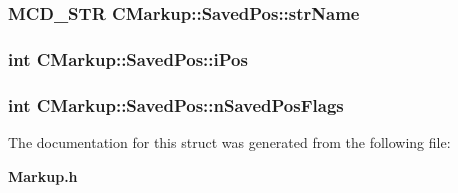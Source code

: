 \subsubsection[strName]{\setlength{\rightskip}{0pt plus 5cm}MCD\_\-STR {\bf CMarkup::SavedPos::strName}}\label{structCMarkup_1_1SavedPos_3613f5e8854f961ed02173d22099db4c}


\subsubsection[iPos]{\setlength{\rightskip}{0pt plus 5cm}int {\bf CMarkup::SavedPos::iPos}}\label{structCMarkup_1_1SavedPos_649563d0d7c11bf2fdebbc0dbe396321}


\subsubsection[nSavedPosFlags]{\setlength{\rightskip}{0pt plus 5cm}int {\bf CMarkup::SavedPos::nSavedPosFlags}}\label{structCMarkup_1_1SavedPos_66a572e011303ea2a3716f7328ad9ec5}




The documentation for this struct was generated from the following file:\begin{CompactItemize}
\item 
{\bf Markup.h}\end{CompactItemize}
